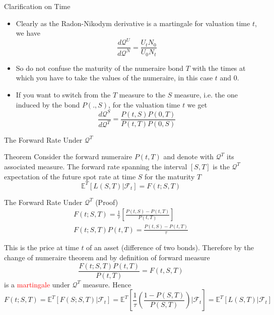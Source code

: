 \documentclass{beamer}
\begin{document}
\begin{frame}{Clarification on Time}
  \begin{itemize}
  \item Clearly as the Radon-Nikodym derivative is a martingale for valuation time $t$, we have
    \begin{equation}
      \frac{d\mathcal{Q}^U}{d\mathcal{Q}^N}=\frac{U_tN_0}{U_0N_t}
    \end{equation}
  \item So do not confuse the maturity of the numeraire bond $T$ with the times at which you have to take the values of the numeraire, in this case $t$ and 0.
  \item If you want to switch from the $T$ measure to the $S$ measure, i.e. the one induced by the bond $P(.,S)$, for the valuation time $t$ we get
    \begin{equation}
      \frac{d\mathcal{Q}^S}{d\mathcal{Q}^T}=\frac{P(t,S)P(0,T)}{P(t,T)P(0,S)}
    \end{equation}
  \end{itemize}
\end{frame}

\begin{frame}{The Forward Rate Under $\mathcal{Q}^T$}
  \begin{block}{Theorem}
    Consider the forward numeraire $P(t,T)$ and denote with $\mathcal{Q}^T$ its associated measure.
    The forward rate spanning the interval $[S,T]$ is the $\mathcal{Q}^T$ expectation of the future spot rate at time $S$ for the maturity $T$
    \begin{equation}
      \mathbb{E}^T[L(S,T)|\mathcal{F}_t] = F(t;S,T)
    \end{equation}
  \end{block}
\end{frame}

\begin{frame}{The Forward Rate Under $\mathcal{Q}^T$ (Proof)}
  \begin{equation*}
    \begin{gathered}
      F(t;S,T) = \frac{1}{\tau}\left[\frac{P(t,S)-P(t,T)}{P(t,T)}\right] \\[0.3cm]
      F(t;S,T)P(t,T) = \frac{P(t,S)-P(t,T)}{\tau}
    \end{gathered}
  \end{equation*}

  This is the price at time $t$ of an asset (difference of two bonds). Therefore by the change of numeraire theorem and by definition of forward measure
  \begin{equation*}
    \frac{F(t;S,T)P(t,T)}{P(t,T)} = F(t,S,T)
  \end{equation*}
  is a \textcolor{red}{martingale} under $\mathcal{Q}^T$ measure. \pause Hence
  \begin{equation*}
    F(t;S,T) = \mathbb{E}^T[F(S;S,T)|\mathcal{F}_t] = \mathbb{E}^T\left[\frac{1}{\tau}\left(\frac{1-P(S,T)}{P(S,T)}\right)\bigg|\mathcal{F}_t\right] = \mathbb{E}^T[L(S,T)|\mathcal{F}_t]
  \end{equation*}
\end{frame}
\end{document}
